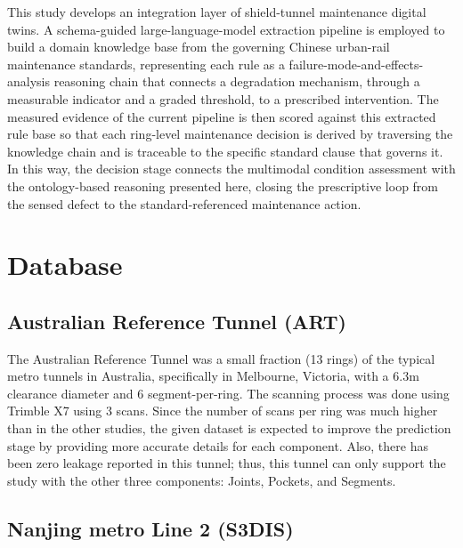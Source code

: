 \documentclass[preprint,12pt,authoryear]{elsarticle}
\begin{document}
This study develops an integration layer of shield-tunnel maintenance
digital twins. A schema-guided large-language-model extraction pipeline
is employed to build a domain knowledge base from the governing Chinese
urban-rail maintenance standards, representing each rule as a
failure-mode-and-effects-analysis reasoning chain that connects a
degradation mechanism, through a measurable indicator and a graded
threshold, to a prescribed intervention. The measured evidence of the
current pipeline is then scored against this extracted rule base so that
each ring-level maintenance decision is derived by traversing the
knowledge chain and is traceable to the specific standard clause that
governs it. In this way, the decision stage connects the multimodal
condition assessment with the ontology-based reasoning presented here,
closing the prescriptive loop from the sensed defect to the
standard-referenced maintenance action.

\section{Database}\label{database}

\subsection{\textbf{Australian Reference Tunnel
(ART)}}\label{australian-reference-tunnel-art}

The Australian Reference Tunnel was a small fraction (13 rings) of the
typical metro tunnels in Australia, specifically in Melbourne, Victoria,
with a 6.3m clearance diameter and 6 segment-per-ring. The scanning
process was done using Trimble X7 using 3 scans. Since the
number of scans per ring was much higher than in the other studies, the
given dataset is expected to improve the prediction stage by providing
more accurate details for each component. Also, there has been zero
leakage reported in this tunnel; thus, this tunnel can only support the
study with the other three components: Joints, Pockets, and Segments.





\subsection{\textbf{Nanjing metro Line 2
(S3DIS)}}\label{nanjing-metro-line-2-s3dis}
\end{document}
